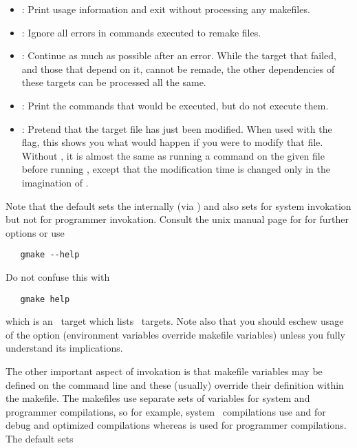 \begin{itemize}
\item
   : Print usage information and exit without processing any
   makefiles.

\item
   : Ignore all  errors  in  commands  executed  to  remake files.

\item
   : Continue as much as possible after an error.   While the target
   that failed, and those that depend on it, cannot be remade, the other
   dependencies of these targets can be processed all the same.

\item
   : Print the commands that would be executed, but do not execute
   them.

\item
   : Pretend that the target file has just been modified.  When used
   with the  flag, this shows you what would happen if you were to
   modify that file.  Without , it is almost the same as running a
    command on the given file before running ,
   except that the modification time is changed only in the imagination of
   .
\end{itemize}

\noindent
Note that the default  sets the 
internally (via ) and also sets  for system invokation
but not for programmer invokation.  Consult the unix manual page for
 for further options or use

\begin{verbatim}
   gmake --help
\end{verbatim}

\noindent
Do not confuse this with

\begin{verbatim}
   gmake help
\end{verbatim}

\noindent
which is an \aipspp\ target which lists \aipspp\ targets.  Note also that you
should eschew usage of the  option (environment variables override
makefile variables) unless you fully understand its implications.

The other important aspect of  invokation is that makefile
variables may be defined on the command line and these (usually) override
their definition within the makefile.  The makefiles use separate sets of
variables for system and programmer compilations, so for example, system
\cplusplus\ compilations use  and  for debug and
optimized compilations whereas  is used for programmer
compilations.  The default  sets

